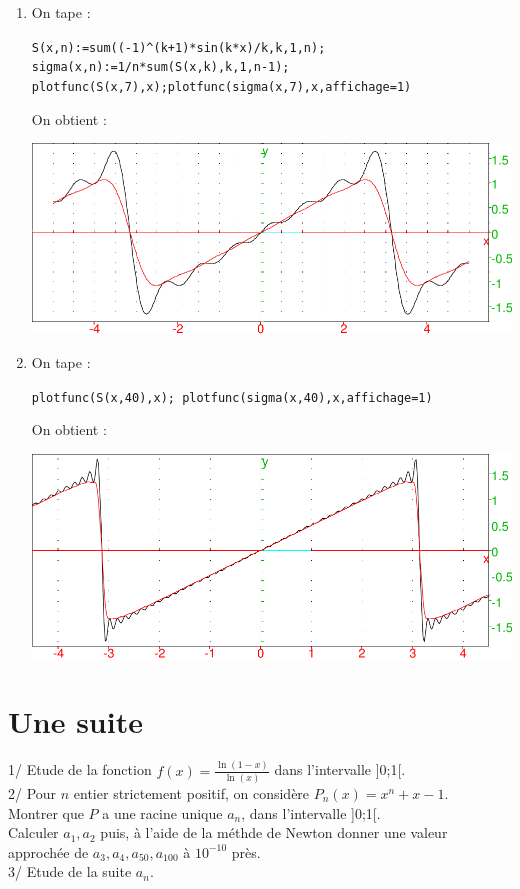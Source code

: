 \documentclass[a4paper,11pt]{book}
\begin{document}
\begin{enumerate}
\item
On tape :
\begin{center}{\tt S(x,n):=sum((-1)\verb|^|(k+1)*sin(k*x)/k,k,1,n); sigma(x,n):=1/n*sum(S(x,k),k,1,n-1);  plotfunc(S(x,7),x);plotfunc(sigma(x,7),x,affichage=1)}\end{center}
On obtient :
\begin{center}\includegraphics[width=\textwidth]{cesaro}\end{center}

\item
On tape :
\begin{center}{\tt  plotfunc(S(x,40),x); plotfunc(sigma(x,40),x,affichage=1)}\end{center}
On obtient :
\begin{center}\includegraphics[width=\textwidth]{cesaro1}\end{center}

\end{enumerate}

\section{Une suite}
1/ Etude de la fonction $f(x)=\displaystyle \frac{\ln(1-x)}{\ln(x)}$ dans 
l'intervalle ]0;1[.\\
2/ Pour $n$ entier strictement positif, on consid\`ere $P_n(x)=x^n+x-1$.\\
Montrer que $P$ a une racine unique $a_n$, dans l'intervalle ]0;1[.\\
Calculer $a_1,a_2$ puis, \`a l'aide de la m\'ethde de Newton donner une valeur
approch\'ee de $a_3,a_4,a_{50},a_{100}$ \`a $10^{-10}$  pr\`es.\\
3/ Etude de la suite $a_n$.
\end{document}
